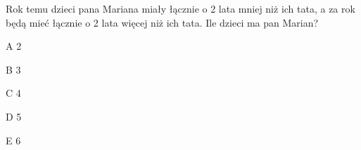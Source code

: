 \begin{tresc}
Rok temu dzieci pana Mariana miały łącznie o 2 lata mniej niż ich tata, a za rok będą mieć łącznie o 2 lata więcej niż ich tata. Ile dzieci ma pan Marian?
\end{tresc}
\begin{wariant}{A} 2 \end{wariant}
\begin{wariant}{B} 3 \end{wariant}
\begin{wariant}{C} 4 \end{wariant}
\begin{wariant}{D} 5 \end{wariant}
\begin{wariant}{E} 6 \end{wariant}
